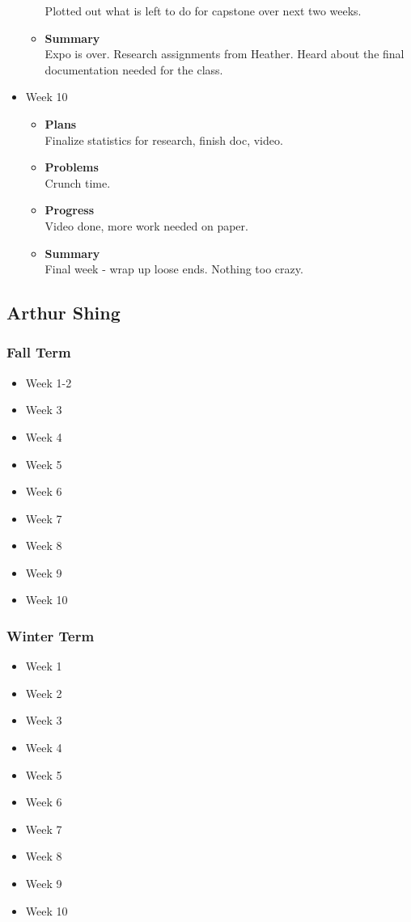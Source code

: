 \begin{itemize}
\begin{itemize}
				Plotted out what is left to do for capstone over next two weeks.
				\item \textbf{Summary} \\
				Expo is over. Research assignments from Heather. Heard about the final documentation needed for the class.
			\end{itemize}
		\item{Week 10}
			\begin{itemize}
				\item \textbf{Plans} \\
				Finalize statistics for research, finish doc, video.
				\item \textbf{Problems} \\
				Crunch time.
				\item \textbf{Progress} \\
				Video done, more work needed on paper.
				\item \textbf{Summary} \\
				Final week - wrap up loose ends. Nothing too crazy.
			\end{itemize}
	\end{itemize}

	\pagebreak


	\subsection{Arthur Shing}
	\subsubsection{Fall Term}
	\begin{itemize}
		\item{Week 1-2}
		\item{Week 3}
		\item{Week 4}
		\item{Week 5}
		\item{Week 6}
		\item{Week 7}
		\item{Week 8}
		\item{Week 9}
		\item{Week 10}
	\end{itemize}
	\subsubsection{Winter Term}
	\begin{itemize}
		\item{Week 1}
		\item{Week 2}
		\item{Week 3}
		\item{Week 4}
		\item{Week 5}
		\item{Week 6}
		\item{Week 7}
		\item{Week 8}
		\item{Week 9}
		\item{Week 10}
	\end{itemize}

